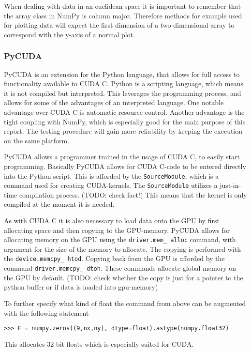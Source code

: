 When dealing with data in an euclidean space it is important to remember that the array class in NumPy is column major. Therefore methods for example used for plotting data will expect the first dimension of a two-dimensional array to correspond with the y-axis of a normal plot. 

\subsubsection{PyCUDA}
PyCUDA is an extension for the Python language, that allows for full access to functionality available to CUDA C. Python is a scripting language, which means it is not compiled but interpreted. This leverages the programming process, and allows for some of the advantages of an interpreted language. One notable advantage over CUDA C is automatic resource control. Another advantage is the tight coupling with NumPy, which is especially good for the main purpose of this report. The testing procedure will gain more reliability by keeping the execution on the same platform.

PyCUDA allows a programmer trained in the usage of CUDA C, to easily start programming. Basically PyCUDA allows for CUDA C-code to be entered directly into the Python script. This is afforded by the \texttt{SourceModule}, which is a command used for creating CUDA-kernels. The \texttt{SourceModule} utilizes a just-in-time compilation process. (TODO: check fact!) This means that the kernel is only compiled at the moment it is needed.

As with CUDA C it is also necessary to load data onto the GPU by first allocating space and then copying to the GPU-memory. PyCUDA allows for allocating memory on the GPU using the \texttt{driver.mem\_ alloc} command, with argument for the size of the memory to allocate. The copying is performed with the \texttt{device.memcpy\_ htod}. Copying back from the GPU is afforded by the command \texttt{driver.memcpy\_ dtoh}. These commands allocate global memory on the GPU by default. (TODO: check whether the copy is just for a pointer to the python buffer or if data is loaded into gpu-memory)

To further specify what kind of float the command from above can be augmented with the following statement

\begin{verbatim}
>>> F = numpy.zeros((9,nx,ny), dtype=float).astype(numpy.float32)
\end{verbatim}

This allocates 32-bit floats which is especially suited for CUDA.




